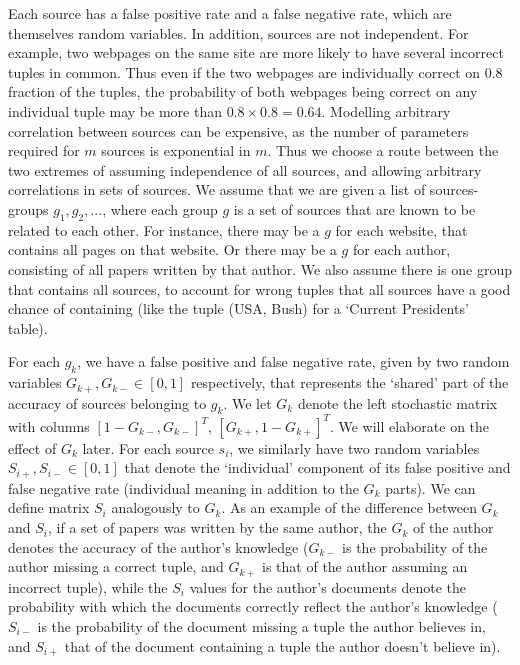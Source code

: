 \documentclass{sig-alternate}
\newcounter{prob}
\begin{document}
Each source has a false positive rate and a false negative rate, which are themselves random variables. In addition, sources are not independent. For example, two webpages on the same site are more likely to have several incorrect tuples in common. Thus even if the two webpages are individually correct on $0.8$ fraction of the tuples, the probability of both webpages being correct on any individual tuple may be more than $0.8 \times 0.8 = 0.64$. Modelling arbitrary  correlation between sources can be expensive, as the number of parameters required for $m$ sources is exponential in $m$. Thus we choose a route between the two extremes of assuming independence of all sources, and allowing arbitrary correlations in sets of sources. We assume that we are given a list of sources-groups $g_1, g_2, ...$, where each group $g$ is a set of sources that are known to be related to each other. For instance, there may be a $g$ for each website, that contains all pages on that website. Or there may be a $g$ for each author, consisting of all papers written by that author. We also assume there is one group that contains all sources, to account for wrong tuples that all sources have a good chance of containing (like the tuple (USA, Bush) for a `Current Presidents' table).

For each $g_k$, we have a false positive and false negative rate, given by two random variables $G_{k+},G_{k-} \in [0,1]$ respectively, that represents the `shared' part of the accuracy of sources belonging to $g_k$. We let $G_k$ denote the left stochastic matrix with columns $[1-G_{k-},G_{k-}]^T$, $[G_{k+},1-G_{k+}]^T$. We will elaborate on the effect of $G_k$ later. For each source $s_i$, we similarly have two random variables $S_{i+},S_{i-} \in [0,1]$ that denote the `individual' component of its false positive and false negative rate (individual meaning in addition to the $G_k$ parts). We can define matrix $S_i$ analogously to $G_k$. As an example of the difference between $G_k$ and $S_i$, if a set of papers was written by the same author, the $G_k$ of the author denotes the accuracy of the author's knowledge ($G_{k-}$ is the probability of the author missing a correct tuple, and $G_{k+}$ is that of the author assuming an incorrect tuple), while the $S_i$ values for the author's documents denote the probability with which the documents correctly reflect the author's knowledge ($S_{i-}$ is the probability of the document missing a tuple the author believes in, and $S_{i+}$ that of the document containing a tuple the author doesn't believe in). 
\end{document}
